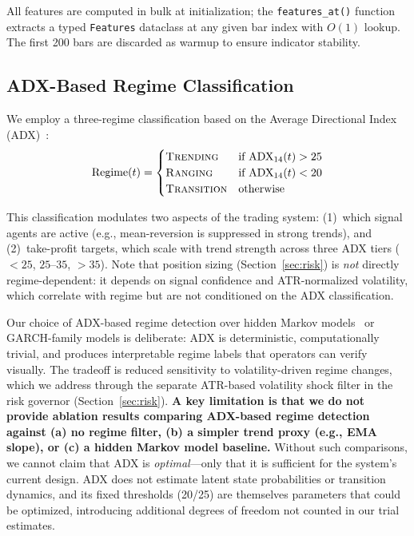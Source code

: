 \documentclass{article}
\begin{document}
All features are computed in bulk at initialization; the \texttt{features\_at()} function extracts a typed \texttt{Features} dataclass at any given bar index with $O(1)$ lookup.
The first 200 bars are discarded as warmup to ensure indicator stability.

\subsection{ADX-Based Regime Classification}

We employ a three-regime classification based on the Average Directional Index (ADX)~\citep{Wilder1978}:
\begin{equation}
  \text{Regime}(t) =
  \begin{cases}
    \text{\textsc{Trending}}   & \text{if } \text{ADX}_{14}(t) > 25 \\
    \text{\textsc{Ranging}}    & \text{if } \text{ADX}_{14}(t) < 20 \\
    \text{\textsc{Transition}} & \text{otherwise}
  \end{cases}
  \label{eq:regime}
\end{equation}

This classification modulates two aspects of the trading system: (1)~which signal agents are active (e.g., mean-reversion is suppressed in strong trends), and (2)~take-profit targets, which scale with trend strength across three ADX tiers ($<25$, $25$--$35$, $>35$).
Note that position sizing (Section~\ref{sec:risk}) is \emph{not} directly regime-dependent: it depends on signal confidence and ATR-normalized volatility, which correlate with regime but are not conditioned on the ADX classification.

Our choice of ADX-based regime detection over hidden Markov models~\citep{Hamilton1989} or GARCH-family models is deliberate: ADX is deterministic, computationally trivial, and produces interpretable regime labels that operators can verify visually.
The tradeoff is reduced sensitivity to volatility-driven regime changes, which we address through the separate ATR-based volatility shock filter in the risk governor (Section~\ref{sec:risk}).
\textbf{A key limitation is that we do not provide ablation results comparing ADX-based regime detection against (a) no regime filter, (b) a simpler trend proxy (e.g., EMA slope), or (c) a hidden Markov model baseline.}
Without such comparisons, we cannot claim that ADX is \emph{optimal}---only that it is sufficient for the system's current design.
ADX does not estimate latent state probabilities or transition dynamics, and its fixed thresholds (20/25) are themselves parameters that could be optimized, introducing additional degrees of freedom not counted in our trial estimates.
\end{document}
